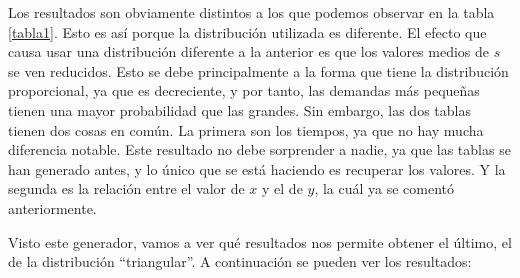 \documentclass[11pt,a4paper]{report}
\begin{document}
Los resultados son obviamente distintos a los que podemos observar en la tabla \ref{tabla1}. Esto es así porque
la distribución utilizada es diferente. El efecto que causa usar una distribución diferente a la anterior es que los
valores medios de $s$ se ven reducidos. Esto se debe principalmente a la forma que tiene la distribución proporcional,
ya que es decreciente, y por tanto, las demandas más pequeñas tienen una mayor probabilidad que las grandes. Sin embargo,
las dos tablas tienen dos cosas en común. La primera son los tiempos, ya que no hay mucha diferencia notable. Este resultado no
debe sorprender a nadie, ya que las tablas se han generado antes, y lo único que se está haciendo es recuperar los valores.
Y la segunda es la relación entre el valor de $x$ y el de $y$, la cuál ya se comentó anteriormente.

Visto este generador, vamos a ver qué resultados nos permite obtener el último, el de la distribución ``triangular''.
A continuación se pueden ver los resultados:
\end{document}
